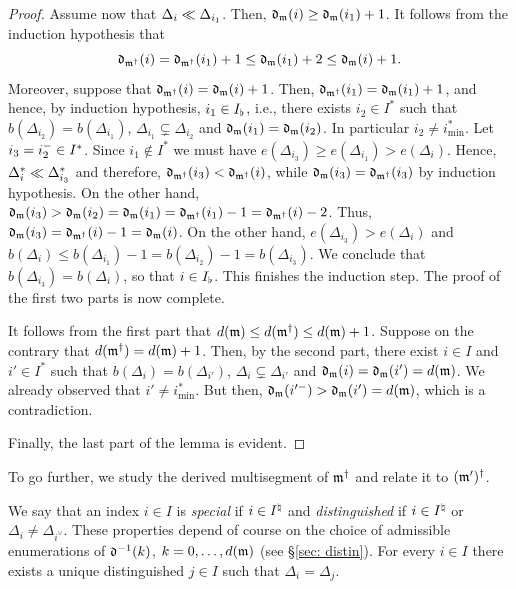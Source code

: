 \documentclass{ert-l} %
\begin{document}
\begin{proof}
Assume now that $\Delta_i\ll\Delta_{i_1}$. Then, $\mathfrak{d}_{\mathfrak{m}}(i)\ge\mathfrak{d}_{\mathfrak{m}}(i_1)+1$.
It follows from the induction hypothesis that
\[
\mathfrak{d}_{\mathfrak{m}^{\dagger}}(i)=\mathfrak{d}_{\mathfrak{m}^{\dagger}}(i_1)+1\le\mathfrak{d}_{\mathfrak{m}}(i_1)+2\le\mathfrak{d}_{\mathfrak{m}}(i)+1.
\]
Moreover, suppose that $\mathfrak{d}_{\mathfrak{m}^{\dagger}}(i)=\mathfrak{d}_{\mathfrak{m}}(i)+1$. Then,
$\mathfrak{d}_{\mathfrak{m}^{\dagger}}(i_1)=\mathfrak{d}_{\mathfrak{m}}(i_1)+1$, and hence,
by induction hypothesis, $i_1\in I_{\flat}$, i.e.,
there exists $i_2\in I^*$ such that  $b(\Delta_{i_2})=b(\Delta_{i_1})$, $\Delta_{i_1}\subsetneq\Delta_{i_2}$
and $\mathfrak{d}_{\mathfrak{m}}(i_1)=\mathfrak{d}_{\mathfrak{m}}(i_2)$. In particular $i_2\ne i^*_{\min}$.
Let $i_3=i_2^-\in I^*$.
Since $i_1\notin I^*$ we must have $e(\Delta_{i_3})\ge e(\Delta_{i_1})>e(\Delta_i)$.
Hence, $\Delta^*_i\ll\Delta^*_{i_3}$ and therefore, $\mathfrak{d}_{\mathfrak{m}^{\dagger}}(i_3)<\mathfrak{d}_{\mathfrak{m}^{\dagger}}(i)$,
while $\mathfrak{d}_{\mathfrak{m}}(i_3)=\mathfrak{d}_{\mathfrak{m}^{\dagger}}(i_3)$ by induction hypothesis.
On the other hand, $\mathfrak{d}_{\mathfrak{m}}(i_3)>\mathfrak{d}_{\mathfrak{m}}(i_2)=\mathfrak{d}_{\mathfrak{m}}(i_1)=\mathfrak{d}_{\mathfrak{m}^{\dagger}}(i_1)-1=\mathfrak{d}_{\mathfrak{m}^{\dagger}}(i)-2$.
Thus, $\mathfrak{d}_{\mathfrak{m}}(i_3)=\mathfrak{d}_{\mathfrak{m}^{\dagger}}(i)-1=\mathfrak{d}_{\mathfrak{m}}(i)$.
On the other hand, $e(\Delta_{i_3})>e(\Delta_i)$ and
$b(\Delta_i)\le b(\Delta_{i_1})-1=b(\Delta_{i_2})-1=b(\Delta_{i_3})$.
We conclude that $b(\Delta_{i_3})=b(\Delta_i)$, so that $i\in I_{\flat}$.
This finishes the induction step. The proof of the first two parts is now complete.

It follows from the first part that $d(\mathfrak{m})\le d(\mathfrak{m}^{\dagger})\le d(\mathfrak{m})+1$.
Suppose on the contrary that $d(\mathfrak{m}^{\dagger})=d(\mathfrak{m})+1$. Then, by the second part, there exist
$i\in I$ and $i'\in I^*$ such that $b(\Delta_i)=b(\Delta_{i'})$, $\Delta_i\subsetneq\Delta_{i'}$
and $\mathfrak{d}_{\mathfrak{m}}(i)=\mathfrak{d}_{\mathfrak{m}}(i')=d(\mathfrak{m})$. We already observed that $i'\ne i^*_{\min}$.
But then, $\mathfrak{d}_{\mathfrak{m}}(i'^-)>\mathfrak{d}_{\mathfrak{m}}(i')=d(\mathfrak{m})$, which is a contradiction.

Finally, the last part of the lemma is evident.
\end{proof}

To go further, we study the derived multisegment of $\mathfrak{m}^{\dagger}$ and relate it to $(\mathfrak{m}')^{\dagger}$.

We say that an index $i\in I$ is \emph{special} if $i\in I^{\natural}$ and  \emph{distinguished} if $i\in I^{\natural}$ or $\Delta_i\ne\Delta_{i^\vee}$.
These properties depend of course on the choice of admissible enumerations of $\mathfrak{d}^{-1}(k)$, $k=0,\dots,d(\mathfrak{m})$
(see \S\ref{sec: distin}).
For every $i\in I$ there exists a unique distinguished $j\in I$ such that $\Delta_i=\Delta_j$.
\end{document}
